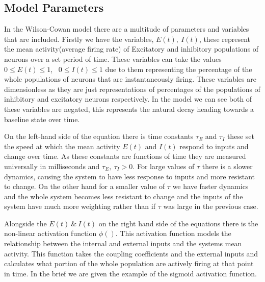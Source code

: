 \documentclass[10pt]{article}
\begin{document}
\subsection{Model Parameters}

\begin{flushleft}

In the Wilson-Cowan model there are a multitude of parameters and variables that are included. Firstly we have the variables, $E(t) , \ I(t)$, these represent the mean activity(average firing rate) of Excitatory and inhibitory populations of neurons over a set period of time. These variables can take the values $0 \leq E(t)\leq 1$, \ $0 \leq I(t)\leq 1$ due to them representing the percentage of the whole populations of neurons that are instantaneously firing. These variables are dimensionless as they are just representations of percentages of the populations of inhibitory and excitatory neurons respectively. In the model we can see both of these variables are negated, this represents the natural decay heading towards a baseline state over time.
\end{flushleft}

\begin{flushleft}
  On the left-hand side of the equation there is time constants $\tau_E$ and $\tau_I$ these set the speed at which the mean activity $E(t)$ and $I(t)$ respond to inputs and change over time. As these constants are functions of time they are measured universally in milliseconds and $\tau_E,\ \tau_I > 0$. For large values of $\tau$ there is a slower dynamics, causing the system to have less response to inputs and more resistant to change. On the other hand for a smaller value of $\tau$ we have faster dynamics and the whole system becomes less resistant to change and the inputs of the system have much more weighting rather than if $\tau$ was large in the previous case.
\end{flushleft}

\begin{flushleft}
    Alongside the $E(t) \ \& \ I(t)$ on the right hand side of the equations there is the non-linear activation function $\phi()$. This activation function models the relationship between the internal and external inputs and the systems mean activity. This function takes the coupling coefficients and the external inputs and calculates what portion of the whole population are actively firing at that point in time. In the brief we are given the example of the sigmoid activation function.
\end{flushleft}
\end{document}

